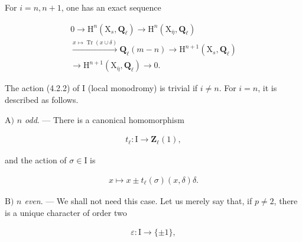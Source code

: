 \documentclass[10pt,leqno]{article}
\begin{document}
\noindent For \(i=n,n+1\), one has an exact sequence\par

\begin{equation*}\begin{gathered}0 \longrightarrow  \mathrm{H}^{n}(\mathrm{X}_{s},\mathbf{Q}_{\ell }) \longrightarrow  \mathrm{H}^{n}(\mathrm{X}_{\overline{\eta }},\mathbf{Q}_{\ell }) \\ \xrightarrow{x\longmapsto \operatorname{Tr}(x\cup \delta )} \mathbf{Q}_{\ell }(m- n) \longrightarrow  \mathrm{H}^{n+1}(\mathrm{X}_{s},\mathbf{Q}_{\ell }) \\ \longrightarrow  \mathrm{H}^{n+1}(\mathrm{X}_{\overline{\eta }},\mathbf{Q}_{\ell }) \longrightarrow  0.\end{gathered}\tag{4.3.3}\end{equation*}

\noindent The action (4.2.2) of \(\mathrm{I}\) (local monodromy) is trivial if \(i\ne n\). For \(i=n\), it is described as follows.\par

\noindent \(\mathrm{A})\) \emph{\(n\) odd}. — There is a canonical homomorphism\par

\begin{equation*}\begin{gathered}t_{\ell } : \mathrm{I} \longrightarrow  \mathbf{Z}_{\ell }(1),\end{gathered}\end{equation*}

\noindent and the action of \(\sigma \in \mathrm{I}\) is\par

\begin{equation*}\begin{gathered}x \longmapsto  x \pm  t_{\ell }(\sigma )(x,\delta )\delta .\end{gathered}\end{equation*}

\clearpage

\label{physical-18}\par\smallskip

\noindent \(\mathrm{B})\) \emph{\(n\) even}. — We shall not need this case. Let us merely say that, if \(p\ne 2\), there is a unique character of order two\par

\begin{equation*}\begin{gathered}\varepsilon  : \mathrm{I} \longrightarrow  \{\pm 1\},\end{gathered}\end{equation*}
\end{document}
